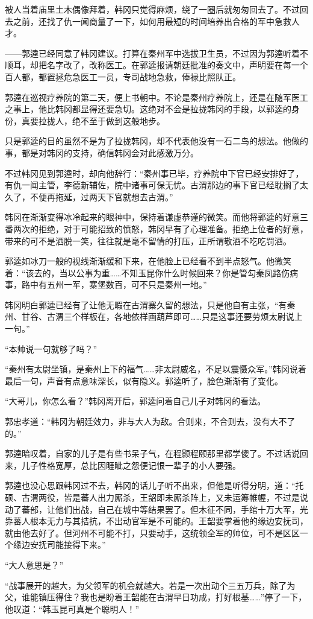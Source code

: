 被人当着庙里土木偶像拜着，韩冈只觉得麻烦，绕了一圈后就匆匆回去了。不过回去之前，还找了仇一闻商量了一下，如何用最短的时间培养出合格的军中急救人才。

——郭逵已经同意了韩冈建议。打算在秦州军中选拔卫生员，不过因为郭逵听着不顺耳，却把名字改了，改称医工。在郭逵报请朝廷批准的奏文中，声明要在每一个百人都，都置拯危急医工一员，专司战地急救，俸禄比照队正。

郭逵在巡视疗养院的第二天，便上书朝中。不论是秦州疗养院上，还是在随军医工之事上，他比韩冈都显得还要急切。这绝对不会是拉拢韩冈的手段，以郭逵的身份，真要拉拢人，绝不至于做到这般地步。

只是郭逵的目的虽然不是为了拉拢韩冈，却不代表他没有一石二鸟的想法。他做的事，都是对韩冈的支持，确信韩冈会对此感激万分。

不过韩冈见到郭逵时，却向他辞行：“秦州事已毕，疗养院中下官已经安排好了，有仇一闻主管，李德新辅佐，院中诸事可保无忧。古渭那边的事下官已经耽搁了太久了，不便再拖延，过两天下官就想去古渭。”

韩冈在渐渐变得冰冷起来的眼神中，保持着谦虚恭谨的微笑。而他将郭逵的好意三番两次的拒绝，对于可能招致的愤怒，韩冈早有了心理准备。拒绝上位者的好意，带来的可不是洒脱一笑，往往就是毫不留情的打压，正所谓敬酒不吃吃罚酒。

郭逵如冰刀一般的视线渐渐缓和下来，在他脸上已经看不到半点怒气。他微笑着：“该去的，当以公事为重……不知玉昆你什么时候回来？你是管勾秦凤路伤病事，路中有五州一军，寨堡数百，可不只是秦州一地。”

韩冈明白郭逵已经有了让他无暇在古渭寨久留的想法，只是他自有主张，“有秦州、甘谷、古渭三个样板在，各地依样画葫芦即可……只是这事还要劳烦太尉说上一句。”

“本帅说一句就够了吗？”

“秦州有太尉坐镇，是秦州上下的福气……非太尉威名，不足以震慑众军。”韩冈说着最后一句，声音有点意味深长，似有隐义。郭逵听了，脸色渐渐有了变化。

“大哥儿，你怎么看？”韩冈离开后，郭逵问着自己儿子对韩冈的看法。

郭忠孝道：“韩冈为朝廷效力，非与大人为敌。合则来，不合则去，没有大不了的。”

郭逵暗叹着，自家的儿子是有些书呆子气，在程颢程颐那里都学傻了。不过话说回来，儿子性格宽厚，总比因睚眦之怨便记恨一辈子的小人要强。

郭逵也没心思跟韩冈过不去，韩冈的话儿子听不出来，但他是听得分明，道：“托硕、古渭两役，皆是蕃人出力厮杀，王韶即未厮杀阵上，又未运筹帷幄，不过是说动了蕃部，让他们出战，自己在城中等结果罢了。但木征不同，手绾十万大军，光靠蕃人根本无力与其拮抗，不出动官军是不可能的。王韶要掌着他的缘边安抚司，就由他去好了。但河州不可能不打，只要动手，这统领全军的帅位，可不是区区一个缘边安抚司能接得下来。”

“大人意思是？”

“战事展开的越大，为父领军的机会就越大。若是一次出动个三五万兵，除了为父，谁能镇压得住？我也是盼着王韶能在古渭早日功成，打好根基……”停了一下，他叹道：“韩玉昆可真是个聪明人！”

